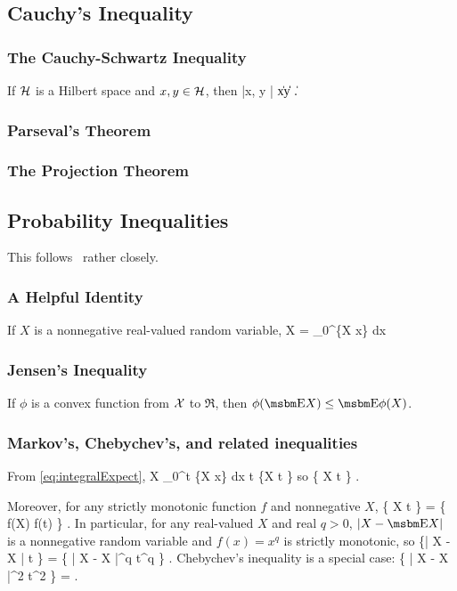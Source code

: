 \subsection{Cauchy's Inequality}

\subsubsection{The Cauchy-Schwartz Inequality}
If ${\cal H}$ is a Hilbert space and $x , y \in {\cal H}$, then
\beq
    |\langle x, y \rangle | \le \|x\| \| y \|.
\eeq
 

\subsubsection{Parseval's Theorem}

\subsubsection{The Projection Theorem}

\subsection{Probability Inequalities}
This follows~\cite{lugosi06} rather closely.

\subsubsection{A Helpful Identity}
If $X$ is a nonnegative real-valued random variable,
\beq \label{eq:integralExpect}
      \EE X = \int_0^\infty \Pr \{X \ge x\} dx
\eeq

\subsubsection{Jensen's Inequality}
If $\phi$ is a convex function from ${\cal X}$ to $\Re$, then $\phi(\EE X) \le \EE \phi(X)$.



\subsubsection{Markov's, Chebychev's, and related inequalities}
From \ref{eq:integralExpect},
\beq
    \EE X \ge \int_0^t \Pr \{X \ge x\} dx \ge t \Pr \{X \ge t \}
\eeq
so
\beq
  \Pr \{ X \ge t \} \le {}.
\eeq

Moreover, for any strictly monotonic function $f$ and nonnegative $X$,
\beq \label{eq:monotoneBound}
   \Pr \{ X \ge t \} = \Pr \{ f(X) \ge f(t) \} \le {}.
\eeq
In particular, for any real-valued $X$ and real $q > 0$,
$| X - \EE X |$ is a nonnegative
random variable and $f(x) = x^q$ is strictly monotonic, so 
\beq
   \Pr \{| X - \EE X | \ge t \} = \Pr \{ | X - \EE X |^q \ge t^q \} \le
             .
\eeq
Chebychev's inequality is a special case:
\beq \label{eq:chebychev}
    \Pr \{ | X - \EE X |^2 \ge t^2 \} \le
             = .
\eeq

